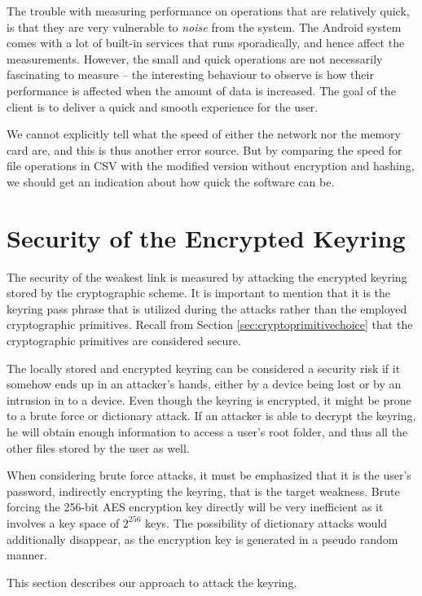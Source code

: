 \documentclass[pdftex,english,10pt,b5paper,twoside]{book}
\begin{document}
The trouble with measuring performance on operations that are relatively quick,
is that they are very vulnerable to \emph{noise} from the system. The Android
system comes with a lot of built-in services that runs sporadically, and hence
affect the measurements. However, the small and quick operations are not
necessarily fascinating to measure -- the interesting behaviour to observe is
how their performance is affected when the amount of data is increased. The
goal of the client is to deliver a quick and smooth experience for the user.

We cannot explicitly tell what the speed of either the network nor the memory
card are, and this is thus another error source. But by comparing the speed for
file operations in \ac{CSV} with the modified version without encryption and
hashing, we should get an indication about how quick the software can be.

\section{Security of the Encrypted Keyring}
\label{sec:BFLK}
The security of the weakest link is measured by attacking the encrypted keyring
stored by the cryptographic scheme. It is important to mention that it is the
keyring pass phrase that is utilized during the attacks rather than the employed
cryptographic primitives. Recall from Section \ref{sec:cryptoprimitivechoice} that the
cryptographic primitives are considered secure. 

The locally stored and encrypted keyring can be considered a security risk if
it somehow ends up in an attacker's hands, either by a device being lost or by
an intrusion in to a device. Even though the keyring is encrypted, it might be
prone to a brute force or dictionary attack. If an attacker is able to decrypt
the keyring, he will obtain enough information to access a user's root folder,
and thus all the other files stored by the user as well.

When considering brute force attacks, it must be emphasized that it is the
user's password, indirectly encrypting the keyring, that is the target weakness.
Brute forcing the 256-bit AES encryption key directly will be very inefficient
as it involves a key space of $2^{256}$ keys. The possibility of dictionary
attacks would additionally disappear, as the encryption key is generated in a
pseudo random manner.

This section describes our approach to attack the keyring.
\end{document}
